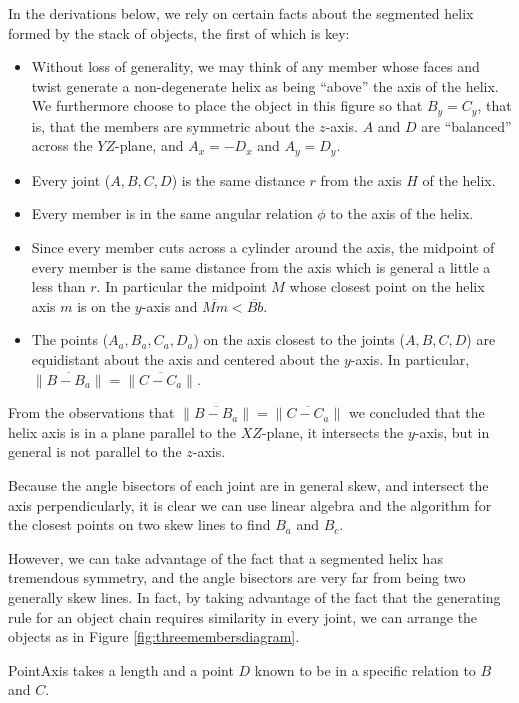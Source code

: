 \documentclass[11pt]{article}
\begin{document}
{In the derivations below, we rely on certain facts about
the segmented helix formed by the stack of objects, the first
of which is key:
\begin{itemize}
\item Without loss of generality, we may think of any member whose faces
  and twist generate a non-degenerate helix as being ``above'' the
  axis of the helix. We furthermore choose to place the object in
  this figure so that $B_y = C_y$, that is, that the members are symmetric
  about the $z$-axis.
  $A$ and $D$ are ``balanced'' across the $YZ$-plane,
  and $A_x = -D_x$ and $A_y = D_y$.
\item Every joint ($A,B,C,D$) is the same distance $r$ from the axis $H$ of the helix.
\item Every member is in the same angular relation $\phi$ to the axis of the helix.
\item Since every member cuts across a cylinder around the axis,
  the midpoint of every member is the same distance from the axis
  which is general a little a less than $r$. In particular the midpoint $M$
  whose closest point on the helix axis $m$ is on the $y$-axis and
  $\overline{Mm} < \overline{Bb}$.
\item The points ($A_a,B_a,C_a,D_a$) on the axis closest to the joints ($A,B,C,D$)
  are equidistant about the axis and centered about the $y$-axis. In
  particular, $\| \overline{B - B_a} \| = \| \overline{C - C_a} \|$.
\end{itemize}

From the observations that $\| \overline{B - B_a} \| = \| \overline{C - C_a} \|$
we concluded that the helix axis is in a plane
parallel to the $XZ$-plane, it intersects the $y$-axis, but in general is
not parallel to the $z$-axis.

Because the angle bisectors of each joint are in general skew, and intersect the
axis perpendicularly, it is clear we can use linear algebra and the algorithm
for the closest points on two skew lines to find $B_a$ and $B_c$.

However, we can take advantage of the fact that a segmented helix has
tremendous symmetry, and the angle bisectors are very far from being two
generally skew lines. In fact, by taking advantage of the fact that the
generating rule for an object chain requires similarity in every joint,
we can arrange the objects as in Figure \ref{fig:threemembersdiagram}.

PointAxis takes a length and a point $D$ known to be in
a specific relation to $B$ and $C$.

}
\end{document}
